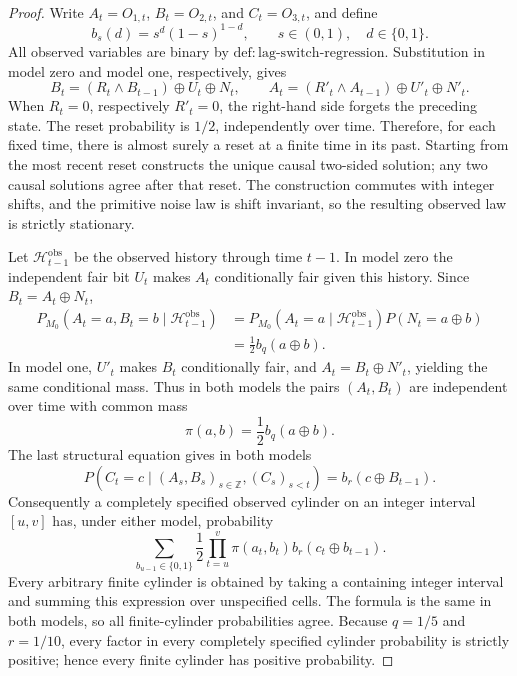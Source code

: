 \documentclass{article}
\begin{document}
\begin{proof}
Write \(A_t=O_{1,t}\), \(B_t=O_{2,t}\), and \(C_t=O_{3,t}\), and define
\[
 b_s(d)=s^d(1-s)^{1-d},\qquad s\in(0,1),\quad d\in\{0,1\}.
\]
All observed variables are binary by \(\mathrm{def:lag\text{-}switch\text{-}regression}\).  Substitution in model zero and model one, respectively, gives
\[
 B_t=(R_t\wedge B_{t-1})\oplus U_t\oplus N_t,
 \qquad
 A_t=(R'_t\wedge A_{t-1})\oplus U'_t\oplus N'_t.
\]
When \(R_t=0\), respectively \(R'_t=0\), the right-hand side forgets the preceding state.  The reset probability is \(1/2\), independently over time.  Therefore, for each fixed time, there is almost surely a reset at a finite time in its past.  Starting from the most recent reset constructs the unique causal two-sided solution; any two causal solutions agree after that reset.  The construction commutes with integer shifts, and the primitive noise law is shift invariant, so the resulting observed law is strictly stationary.

Let \(\mathcal H^{\mathrm{obs}}_{t-1}\) be the observed history through time \(t-1\).  In model zero the independent fair bit \(U_t\) makes \(A_t\) conditionally fair given this history.  Since \(B_t=A_t\oplus N_t\),
\[
 \begin{aligned}
 P_{M_0}(A_t=a,B_t=b\mid\mathcal H^{\mathrm{obs}}_{t-1})
 &=P_{M_0}(A_t=a\mid\mathcal H^{\mathrm{obs}}_{t-1})P(N_t=a\oplus b)\\
 &=\frac12 b_q(a\oplus b).
 \end{aligned}
\]
In model one, \(U'_t\) makes \(B_t\) conditionally fair, and \(A_t=B_t\oplus N'_t\), yielding the same conditional mass.  Thus in both models the pairs \((A_t,B_t)\) are independent over time with common mass
\[
 \pi(a,b)=\frac12 b_q(a\oplus b).
\]
The last structural equation gives in both models
\[
 P(C_t=c\mid(A_s,B_s)_{s\in\mathbb Z},(C_s)_{s<t})
 =b_r(c\oplus B_{t-1}).
\]
Consequently a completely specified observed cylinder on an integer interval \([u,v]\) has, under either model, probability
\[
 \sum_{b_{u-1}\in\{0,1\}}\frac12
 \prod_{t=u}^{v}\pi(a_t,b_t)b_r(c_t\oplus b_{t-1}).
\]
Every arbitrary finite cylinder is obtained by taking a containing integer interval and summing this expression over unspecified cells.  The formula is the same in both models, so all finite-cylinder probabilities agree.  Because \(q=1/5\) and \(r=1/10\), every factor in every completely specified cylinder probability is strictly positive; hence every finite cylinder has positive probability.


\end{proof}
\end{document}
